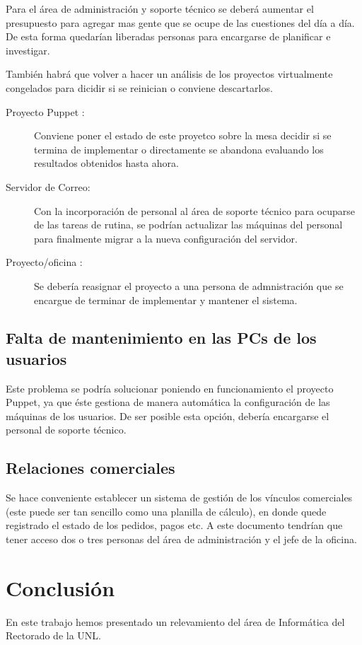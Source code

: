 \documentclass[a4paper,11pt,oneside]{article}
\begin{document}
\begin{description}
Para el área de administración y soporte técnico se deberá aumentar el
presupuesto para agregar mas gente que se ocupe de las cuestiones del
día a día. De esta forma quedarían liberadas personas para encargarse
de planificar e investigar.

También habrá que volver a hacer un análisis de los proyectos
virtualmente congelados para dicidir si se reinician o conviene
descartarlos.

\begin{description}
\item[Proyecto Puppet :]Conviene poner el estado de este proyetco
  sobre la mesa decidir si se termina de implementar o directamente se
  abandona evaluando los resultados obtenidos hasta ahora.
\item[Servidor de Correo:] Con la incorporación de personal al área de
  soporte técnico para ocuparse de las tareas de rutina, se podrían
  actualizar las máquinas del personal para finalmente migrar a la
  nueva configuración del servidor.
\item[Proyecto/oficina :]Se debería reasignar el proyecto a una persona de
  admnistración que se encargue de terminar de implementar y mantener el sistema.
\end{description}

\subsection*{Falta de mantenimiento en las PCs de los usuarios}
Este problema se podría solucionar poniendo en funcionamiento el
proyecto Puppet, ya que éste gestiona de manera automática la
configuración de las máquinas de los usuarios.  De ser posible esta
opción, debería encargarse el personal de soporte técnico.
\subsection*{Relaciones comerciales}
Se hace conveniente establecer un sistema de gestión de los vínculos
comerciales (este puede ser tan sencillo como una planilla de
cálculo), en donde quede registrado el estado de los pedidos, pagos
etc. A este documento tendrían que tener acceso dos o tres personas del
área de administración y el jefe de la oficina.

\newpage
\section*{Conclusión}
En este trabajo hemos presentado un relevamiento del área de
Informática del Rectorado de la UNL.


\end{description}
\end{document}
